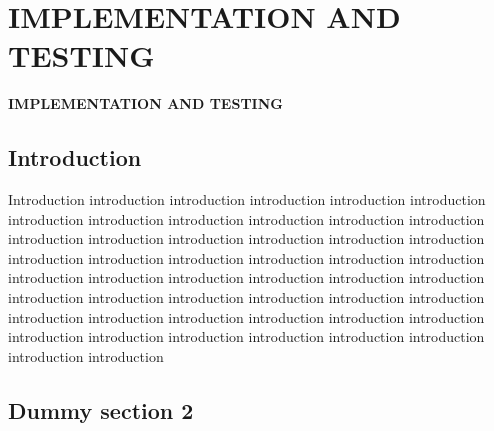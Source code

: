 \chapter{IMPLEMENTATION AND TESTING}
\pagebreak


\begin{center}
{\LARGE\textbf{IMPLEMENTATION AND TESTING}}
\end{center}


\section{Introduction}
Introduction introduction introduction introduction introduction introduction introduction introduction introduction introduction introduction introduction introduction introduction introduction introduction introduction introduction introduction introduction introduction introduction introduction introduction introduction introduction introduction introduction introduction introduction introduction introduction introduction introduction introduction introduction introduction introduction introduction introduction introduction introduction introduction introduction introduction introduction introduction introduction introduction introduction 

\section{Dummy section 2}